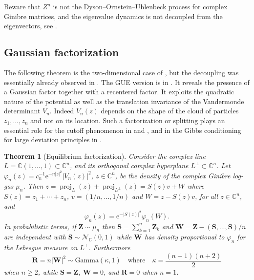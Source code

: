 \documentclass[11pt,reqno]{amsart}
\numberwithin{equation}{section}%
\numberwithin{figure}{section}%
\numberwithin{table}{section}
\theoremstyle{plain}
\newtheorem{theorem}{Theorem}[section]
\theoremstyle{definition}
\begin{document}
Beware that $Z^n$ is not the Dyson--Ornstein--Uhlenbeck process for complex
Ginibre matrices, and the eigenvalue dynamics is not decoupled from the
eigenvectors, see \cite{BourgadeDubachOverlaps}.

\subsection{Gaussian factorization}

The following theorem is the two-dimensional case of
\cite[Th.~6.1]{ChafaiAspects}, but the decoupling was essentially already
observed in \cite{Laughlin}. The GUE version is in \cite{ChafaiLehec}. It
reveals the presence of a Gaussian factor together with a recentered factor.
It exploits the quadratic nature of the potential as well as the translation
invariance of the Vandermonde determinant $V_n$. Indeed $V_n(z)$ depends on
the shape of the cloud of particles $z_1,\ldots,z_n$ and not on its location.
Such a factorization or splitting plays an essential role for the cutoff
phenomenon in \cite{BoursierChafaiLabbe} and \cite{ChafaiFathiCutoff}, and in
the Gibbs conditioning for large deviation principles in
\cite*{ChafaiFerreStoltz}.

\begin{theorem}[Equilibrium factorization]\label{th:split}
  Consider the complex line $L=\mathbb{C}(1,\ldots,1)\subset\mathbb{C}^n$, and
  its orthogonal complex hyperplane $L^\perp\subset\mathbb{C}^n$. Let
  $\varphi_n(z)=c_n^{-1}\mathrm{e}^{-n|z|^2}|V_n(z)|^2$, $z\in\mathbb{C}^n$,
  be the density of the complex Ginibre log-gas $\mu_n$. Then
  $z=\operatorname{proj}_L(z)+\operatorname{proj}_{L^\perp}(z)=S(z)v+W$ where
  $S(z)=z_1+\cdots+z_n$, $v=(1/n,\ldots,1/n)$ and $W=z-S(z)v$, for all
  $z\in\mathbb{C}^n$, and
  \begin{equation}
    \varphi_n(z)=\mathrm{e}^{-|S(z)|^2}\varphi_n(W).
  \end{equation}
  In probabilistic terms, if $\mathbf{Z}\sim\mu_n$ then
  $\mathbf{S}=\sum_{k=1}^n\mathbf{Z}_k$ and
  $\mathbf{W}=\mathbf{Z}-(\mathbf{S},\ldots,\mathbf{S})/n$ are independent
  with $\mathbf{S}\sim\mathcal{N}_{\mathbb{C}}(0,1)$ while $\mathbf{W}$ has
  density proportional to $\varphi_n$ for the Lebesgue measure on $L^\perp$.
  Furthermore%
  \[
    \mathbf{R}=n|\mathbf{W}|^2\sim\mathrm{Gamma}(\kappa,1)
    \quad\text{where}\quad
    \kappa=\frac{(n-1)(n+2)}{2}
  \]
  when $n\geq2$, while $\mathbf{S}=\mathbf{Z}$, $\mathbf{W}=0$, and
  $\mathbf{R}=0$ when $n=1$.
\end{theorem}
\end{document}
